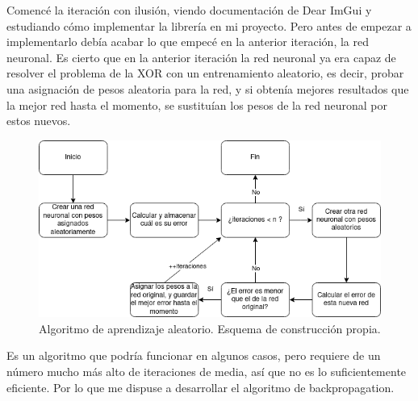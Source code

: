 Comencé la iteración con ilusión, viendo documentación de Dear ImGui y estudiando cómo implementar la librería en mi proyecto. Pero antes de empezar a implementarlo debía acabar lo que empecé en la anterior iteración, la red neuronal. Es cierto que en la anterior iteración la red neuronal ya era capaz de resolver el problema de la XOR con un entrenamiento aleatorio, es decir, probar una asignación de pesos aleatoria para la red, y si obtenía mejores resultados que la mejor red hasta el momento, se sustituían los pesos de la red neuronal por estos nuevos.
\begin{figure}[H]
	\centering
	\includegraphics[width=15cm]{archivos/imagenes/Algoritmo-red-neuronal-aleatorio.png}
	\caption{Algoritmo de aprendizaje aleatorio. Esquema de construcción propia.}
	\label{Algoritmo aleatorio}
\end{figure}
Es un algoritmo que podría funcionar en algunos casos, pero requiere de un número mucho más alto de iteraciones de media, así que no es lo suficientemente eficiente. Por lo que me dispuse a desarrollar el algoritmo de backpropagation.

